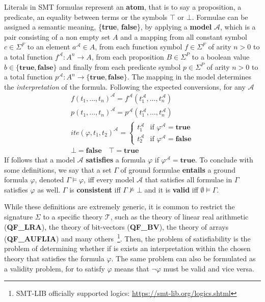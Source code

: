 \documentclass[runningheads]{llncs}
\begin{document}
Literals in SMT formulas represent an \textbf{atom}, that is to say a proposition, a predicate, an equality between terms or the symbols $\top$ or $\bot$.
Formulae can be assigned a semantic meaning, \{\textbf{true}, \textbf{false}\}, by applying a \textbf{model} $\mathcal{A}$, which is a pair consisting of a non empty set $A$ and a mapping from all constant symbol $c \in \Sigma^F$ to an element $a^\mathcal{A} \in A$, from each function symbol $f \in \Sigma^F$ of arity $n > 0$ to a total function $f^\mathcal{A} : A^n \to A$, from each proposition $B \in \Sigma^{P}$ to a boolean value $b \in \{\textbf{true}, \textbf{false}\}$ and finally from each predicate symbol $p \in \Sigma^P$ of arity $n > 0$ to a total function $p^\mathcal{A} : A^n \to \{ \textbf{true}, \textbf{false} \}$.
The mapping in the model determines the \textit{interpretation} of the formula.
Following the expected conversions, for any $\mathcal{A}$
\begin{gather*}
    f(t_1, \dots, t_n)^{\mathcal{A}} = f^{\mathcal{A}}(t_1^{\mathcal{A}}, \dots, t_n^{\mathcal{A}}) \\
    p(t_1, \dots, t_n)^{\mathcal{A}} = p^{\mathcal{A}}(t_1^{\mathcal{A}}, \dots, t_n^{\mathcal{A}}) \\
    ite(\varphi, t_1, t_2)^{\mathcal{A}} = \begin{cases}
        t_1^{\mathcal{A}} & \text{if } \varphi^{\mathcal{A}} = \textbf{true}  \\
        t_2^{\mathcal{A}} & \text{if } \varphi^{\mathcal{A}} = \textbf{false}
    \end{cases} \\
    \bot = \textbf{false} \quad \top = \textbf{true}
\end{gather*}
If follows that a model $\mathcal{A}$ \textbf{satisfies} a formula $\varphi$ if $\varphi^{\mathcal{A}} = \textbf{true}$.
To conclude with some definitions, we say that a set $\Gamma$ of ground formulae \textbf{entails} a ground formula $\varphi$, denoted $\Gamma \models \varphi$, iff every model $\mathcal{A}$ that satisfies all formulae in $\Gamma$ satisfies $\varphi$ as well.
$\Gamma$ is \textbf{consistent} iff $\Gamma \not\models \bot$ and it is \textbf{valid} iff $\emptyset \models \Gamma$.

While these definitions are extremely generic, it is common to restrict the signature $\Sigma$ to a specific theory $\mathcal{T}$, such as the theory of linear real arithmetic (\textbf{QF\_LRA}), the theory of bit-vectors (\textbf{QF\_BV}), the theory of arrays (\textbf{QF\_AUFLIA}) and many others~\footnote{SMT-LIB officially supported logics: \url{https://smt-lib.org/logics.shtml}}.
Then, the problem of satisfiability is the problem of determining whether if is exists an interpretation within the chosen theory that satisfies the formula $\varphi$.
The same problem can also be formulated as a validity problem, for to satisfy $\varphi$ means that $\neg\varphi$ must be valid and vice versa.
\end{document}
